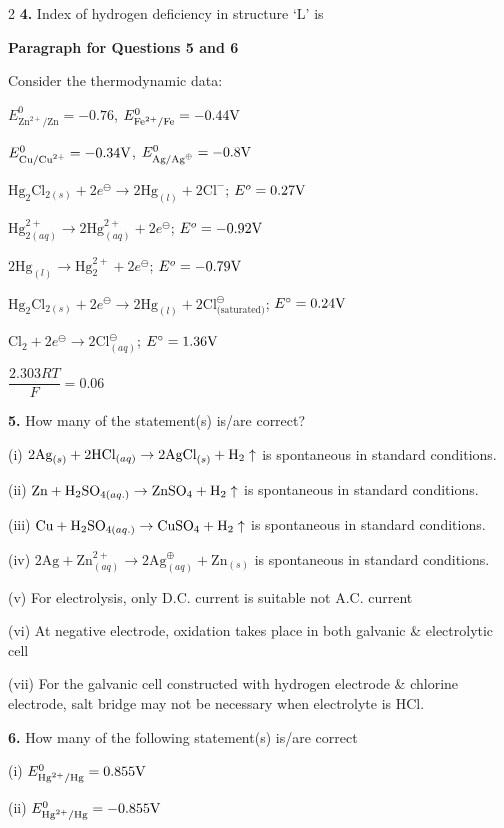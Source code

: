 \documentclass[10pt]{extarticle}
\begin{document}
\begin{multicols}{2}
\textbf{4.} Index of hydrogen deficiency in structure `L' is

\textbf{Paragraph for Questions 5 and 6}

Consider the thermodynamic data:

$E^0_{\text{Zn}^{2+}/\text{Zn}}=-0.76$, $E^0_{\text{Fe}^{2+}/\text{Fe}}=-0.44\text V$

$E^0_{\text{Cu/Cu}^{2+}}=-0.34\text V$, $E^0_{\text{Ag/Ag}^\oplus}=-0.8\text V$

$\text{Hg}_2\text{Cl}_{2(s)}+2e^\ominus\to2\text{Hg}_{(l)}+2\text{Cl}^-$; $E^o=0.27\text V$

$\text{Hg}_{2(aq)}^{2+}\to2\text{Hg}_{(aq)}^{2+}+2e^\ominus$; $E^o=-0.92\text V$

$2\text{Hg}_{(l)}\to\text{Hg}_2^{2+}+2e^\ominus$; $E^o=-0.79\text V$

$\text{Hg}_2\text{Cl}_{2(s)}+2e^\ominus\to2\text{Hg}_{(l)}+2\text{Cl}^\ominus_{\text{(saturated)}}$; $E^\circ=0.24\text V$

$\text{Cl}_2+2e^\ominus\to2\text{Cl}^\ominus_{(aq)}$; $E^\circ=1.36\text V$

$\dfrac{2.303RT}F=0.06$

\textbf{5.} How many of the statement(s) is/are correct?

(i) $2\text{Ag}_{(s)}+2\text{HCl}_{(aq)}\to2\text{AgCl}_{(s)}+\text H_2\uparrow$ is spontaneous in standard conditions.

(ii) $\text{Zn}+\text H_2\text{SO}_{4(aq.)}\to\text{ZnSO}_4+\text H_2\uparrow$ is spontaneous in standard conditions.

(iii) $\text{Cu}+\text H_2\text{SO}_{4(aq.)}\to\text{CuSO}_4+\text H_2\uparrow$ is spontaneous in standard conditions.

(iv) $2\text{Ag}+\text{Zn}^{2+}_{(aq)}\to2\text{Ag}^\oplus_{(aq)}+\text{Zn}_{(s)}$ is spontaneous in standard conditions.

(v) For electrolysis, only D.C. current is suitable not A.C. current

(vi) At negative electrode, oxidation takes place in both galvanic \& electrolytic cell

(vii) For the galvanic cell constructed with hydrogen electrode \& chlorine electrode, salt bridge may not be necessary when electrolyte is HCl.

\textbf{6.} How many of the following statement(s) is/are correct

(i) $E^0_{\text{Hg}^{2+}/\text{Hg}}=0.855\text V$

(ii) $E^0_{\text{Hg}^{2+}/\text{Hg}}=-0.855\text V$


\end{multicols}
\end{document}
